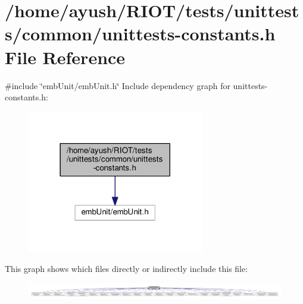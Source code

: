 \hypertarget{unittests-constants_8h}{}\section{/home/ayush/\+R\+I\+O\+T/tests/unittests/common/unittests-\/constants.h File Reference}
\label{unittests-constants_8h}
{\ttfamily \#include \char`\"{}emb\+Unit/emb\+Unit.\+h\char`\"{}}\newline
Include dependency graph for unittests-\/constants.h\+:
\nopagebreak
\begin{figure}[H]
\begin{center}
\leavevmode
\includegraphics[width=218pt]{unittests-constants_8h__incl}
\end{center}
\end{figure}
This graph shows which files directly or indirectly include this file\+:
\nopagebreak
\begin{figure}[H]
\begin{center}
\leavevmode
\includegraphics[width=350pt]{unittests-constants_8h__dep__incl}
\end{center}
\end{figure}
